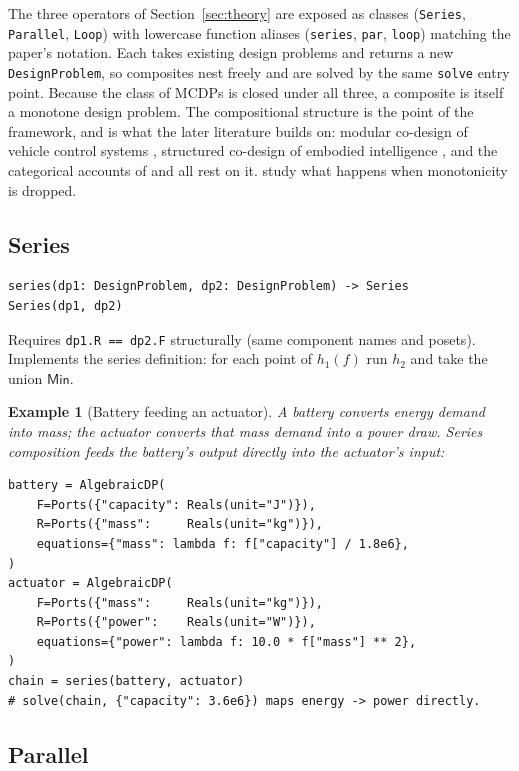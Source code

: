 \documentclass[11pt,a4paper]{article}
\newtheorem{example}[definition]{Example}
\newcommand{\Min}{\mathsf{Min}}
\begin{document}
The three operators of Section~\ref{sec:theory} are exposed as classes
(\texttt{Series}, \texttt{Parallel}, \texttt{Loop}) with lowercase
function aliases (\texttt{series}, \texttt{par}, \texttt{loop}) matching
the paper's notation. Each takes existing design problems and returns a
new \texttt{DesignProblem}, so composites nest freely and are solved by
the same \texttt{solve} entry point. Because the class of MCDPs is closed
under all three, a composite is itself a monotone design problem. The
compositional structure is the point of the framework, and is what the
later literature builds on: modular co-design of vehicle control systems
\citep{zardini2022taskdriven}, structured co-design of embodied
intelligence \citep{zardini2021embodied}, and the categorical accounts of
\citet{furter2026symmetric} and \citet{riess2026quantale} all rest on it.
 study what happens when monotonicity is dropped.

\subsection{Series}

\begin{lstlisting}
series(dp1: DesignProblem, dp2: DesignProblem) -> Series
Series(dp1, dp2)
\end{lstlisting}

Requires \texttt{dp1.R == dp2.F} structurally (same component names
and posets). Implements the series definition: for each point of
$h_1(f)$ run $h_2$ and take the union $\Min$.

\begin{example}[Battery feeding an actuator]
A battery converts energy demand into mass; the actuator converts
that mass demand into a power draw. Series composition feeds the
battery's output directly into the actuator's input:
\begin{lstlisting}
battery = AlgebraicDP(
    F=Ports({"capacity": Reals(unit="J")}),
    R=Ports({"mass":     Reals(unit="kg")}),
    equations={"mass": lambda f: f["capacity"] / 1.8e6},
)
actuator = AlgebraicDP(
    F=Ports({"mass":     Reals(unit="kg")}),
    R=Ports({"power":    Reals(unit="W")}),
    equations={"power": lambda f: 10.0 * f["mass"] ** 2},
)
chain = series(battery, actuator)
# solve(chain, {"capacity": 3.6e6}) maps energy -> power directly.
\end{lstlisting}
\end{example}

\subsection{Parallel}
\end{document}
